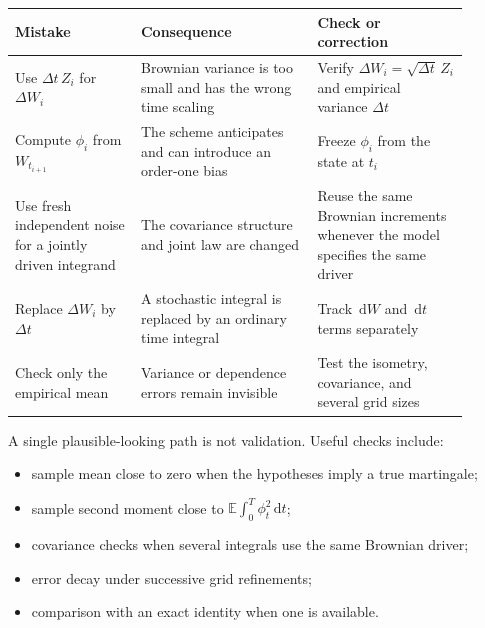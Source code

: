 \documentclass[10pt]{article}
\newcommand{\E}{\mathbb E}
\newcommand{\1}{\mathbf 1}
\newcommand{\dd}{\,\mathrm d}
\theoremstyle{definition}
\begin{document}
\begin{center}
\small
\begin{tabular}{p{0.25\linewidth}p{0.35\linewidth}p{0.30\linewidth}}
\toprule
Mistake & Consequence & Check or correction \\
\midrule
Use \(\Delta t\,Z_i\) for \(\Delta W_i\)
& Brownian variance is too small and has the wrong time scaling
& Verify \(\Delta W_i=\sqrt{\Delta t}\,Z_i\) and empirical variance \(\Delta t\) \\
\addlinespace
Compute \(\phi_i\) from \(W_{t_{i+1}}\)
& The scheme anticipates and can introduce an order-one bias
& Freeze \(\phi_i\) from the state at \(t_i\) \\
\addlinespace
Use fresh independent noise for a jointly driven integrand
& The covariance structure and joint law are changed
& Reuse the same Brownian increments whenever the model specifies the same driver \\
\addlinespace
Replace \(\Delta W_i\) by \(\Delta t\)
& A stochastic integral is replaced by an ordinary time integral
& Track \(\dd W\) and \(\dd t\) terms separately \\
\addlinespace
Check only the empirical mean
& Variance or dependence errors remain invisible
& Test the isometry, covariance, and several grid sizes \\
\bottomrule
\end{tabular}
\end{center}

A single plausible-looking path is not validation. Useful checks include:
\begin{itemize}
  \item sample mean close to zero when the hypotheses imply a true martingale;
  \item sample second moment close to
        \(\E\int_0^T\phi_t^2\dd t\);
  \item covariance checks when several integrals use the same Brownian driver;
  \item error decay under successive grid refinements;
  \item comparison with an exact identity when one is available.
\end{itemize}
\end{document}
